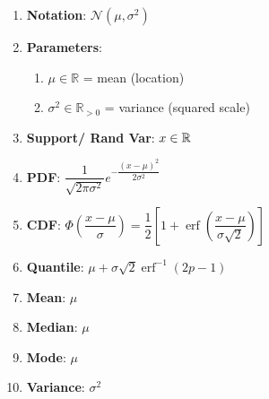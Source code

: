 \begin{enumerate}

    \item
    \textbf{Notation}:
    $
        {\displaystyle {\mathcal {N}}(\mu ,\sigma ^{2})}
    $
    \hfill \cite{wiki/Normal_distribution}

    \item
    \textbf{Parameters}:
    \begin{enumerate}
        \item ${\displaystyle \mu \in \mathbb {R} }$ = mean (location)
        \hfill \cite{wiki/Normal_distribution}

        \item ${\displaystyle \sigma ^{2}\in \mathbb {R} _{>0}}$ = variance (squared scale)
        \hfill \cite{wiki/Normal_distribution}
    \end{enumerate}

    \item
    \textbf{Support/ Rand Var}:
    $x \in \mathbb{R}$
    \hfill \cite{wiki/Normal_distribution}

    \item
    \textbf{PDF}:
    $ {\displaystyle {\dfrac {1}{\sqrt {2\pi \sigma ^{2}}}}e^{-{\dfrac {(x-\mu )^{2}}{2\sigma ^{2}}}}} $
    \hfill\cite{wiki/Normal_distribution}

    \item
    \textbf{CDF}:
    $ {\displaystyle \Phi \left({\dfrac {x-\mu }{\sigma }}\right)={\dfrac {1}{2}}\left[1+\operatorname {erf} \left({\dfrac {x-\mu }{\sigma {\sqrt {2}}}}\right)\right]} $
    \hfill\cite{wiki/Normal_distribution}

    \item
    \textbf{Quantile}:
    $ {\displaystyle \mu +\sigma {\sqrt {2}}\operatorname {erf} ^{-1}(2p-1)} $
    \hfill\cite{wiki/Normal_distribution}

    \item
    \textbf{Mean}:
    $ {\displaystyle \mu } $
    \hfill\cite{wiki/Normal_distribution}

    \item
    \textbf{Median}:
    $ {\displaystyle \mu } $
    \hfill\cite{wiki/Normal_distribution}

    \item
    \textbf{Mode}:
    $ {\displaystyle \mu } $
    \hfill\cite{wiki/Normal_distribution}

    \item
    \textbf{Variance}:
    $ {\displaystyle \sigma ^{2}} $
    \hfill\cite{wiki/Normal_distribution}


\end{enumerate}
